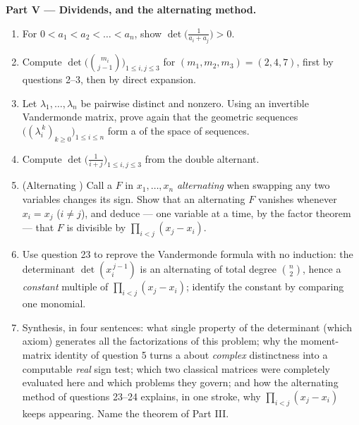 \begin{problem}
\medskip
\noindent\textbf{Part V --- Dividends, and the alternating
method.}
\begin{enumerate}[resume]
  \item For $0 < a_1 < a_2 < \dots < a_n$, show
        $\det\bigl(\frac{1}{a_i + a_j}\bigr) > 0$.
  \item Compute $\det\bigl(\binom{m_i}{j-1}\bigr)_{1 \leq i, j
        \leq 3}$ for $(m_1, m_2, m_3) = (2, 4, 7)$, first by
        questions 2--3, then by direct expansion.
  \item Let $\lambda_1, \dots, \lambda_n$ be pairwise distinct
        and nonzero. Using an invertible Vandermonde matrix,
        prove again that the geometric sequences
        $\bigl((\lambda_i^{\,k})_{k \geq 0}\bigr)_{1 \leq i \leq
        n}$ form a  of the space of sequences.
  \item Compute $\det\bigl(\frac{1}{i + j}\bigr)_{1 \leq i, j
        \leq 3}$ from the double alternant.
  \item (Alternating ) Call a  $F$ in $x_1,
        \dots, x_n$ \emph{alternating} when swapping any two
        variables changes its sign. Show that an alternating $F$
        vanishes whenever $x_i = x_j$ ($i \neq j$), and deduce
        --- one variable at a time, by the factor theorem ---
        that $F$ is divisible by $\prod_{i<j}(x_j - x_i)$.
  \item Use question 23 to reprove the Vandermonde formula with
        no induction: the determinant $\det(x_i^{\,j-1})$ is an
        alternating  of total degree $\binom n2$,
        hence a \emph{constant} multiple of $\prod_{i<j}(x_j -
        x_i)$; identify the constant by comparing one monomial.
  \item Synthesis, in four sentences: what single property of
        the determinant (which axiom) generates all the
        factorizations of this problem; why the moment-matrix
        identity of question 5 turns a  about
        \emph{complex} distinctness into a computable
        \emph{real} sign test; which two classical matrices were
        completely evaluated here and which  problems they
        govern; and how the alternating method of questions
        23--24 explains, in one stroke, why $\prod_{i<j}(x_j -
        x_i)$ keeps appearing. Name the theorem of Part III.
\end{enumerate}
\end{problem}
